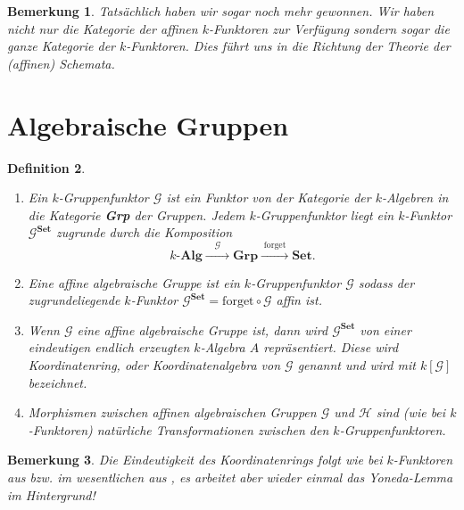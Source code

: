 \documentclass[a4paper, 11pt]{scrartcl}
\theoremstyle{basicstyle}
\newtheorem{definition}{Definition}[section]
\newtheorem{bemerkung}[definition]{Bemerkung}
\begin{document}
    \begin{bemerkung}
        Tatsächlich haben wir sogar noch mehr gewonnen.
        Wir haben nicht nur die Kategorie der affinen \(k\)-Funktoren zur Verfügung sondern sogar die ganze Kategorie der \(k\)-Funktoren.
        Dies führt uns in die Richtung der Theorie der (affinen) Schemata.
    \end{bemerkung}
    

    \section{Algebraische Gruppen}

    \begin{definition}
        \begin{enumerate}
            \item Ein \emph{\(k\)-Gruppenfunktor} \(\mathcal{G}\) ist ein Funktor von der Kategorie der \(k\)-Algebren in die Kategorie \textbf{Grp} der Gruppen.
                Jedem \(k\)-Gruppenfunktor liegt ein \(k\)-Funktor \(\mathcal{G}^{\textbf{Set}}\) zugrunde durch die Komposition
                \[k\textbf{-Alg} \xrightarrow{\quad \mathcal{G} \quad} \textbf{Grp} \xrightarrow{\;\text{forget}\;} \textbf{Set}.\]

            \item Eine \emph{affine algebraische Gruppe} ist ein \(k\)-Gruppenfunktor \(\mathcal{G}\) sodass der zugrundeliegende \(k\)-Funktor \(\mathcal{G}^{\textbf{Set}} = \text{forget} \circ \mathcal{G}\) affin ist.
            
            \item Wenn \(\mathcal{G}\) eine affine algebraische Gruppe ist, dann wird \(\mathcal{G}^{\textbf{Set}}\) von einer eindeutigen endlich erzeugten \(k\)-Algebra \(A\) repräsentiert.
                Diese wird \emph{Koordinatenring}, oder \emph{Koordinatenalgebra} von \(\mathcal{G}\) genannt und wird mit \(k[\mathcal{G}]\) bezeichnet.

            \item Morphismen zwischen affinen algebraischen Gruppen \(\mathcal{G}\) und \(\mathcal{H}\) sind (wie bei \(k\)-Funktoren) natürliche Transformationen zwischen den \(k\)-Gruppenfunktoren.
        \end{enumerate}
    \end{definition}

    \begin{bemerkung}
        Die Eindeutigkeit des Koordinatenrings folgt wie bei \(k\)-Funktoren aus  bzw. im wesentlichen aus , es arbeitet aber wieder einmal das Yoneda-Lemma im Hintergrund!
    \end{bemerkung}
\end{document}
